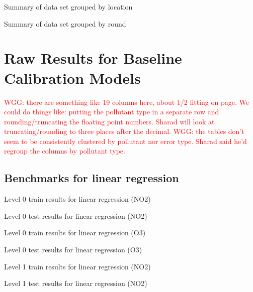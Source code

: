 \documentclass[journal abbreviation, manuscript]{copernicus}
\newcommand\todo[1]{\textcolor{red}{#1}}
\begin{document}
\begin{table}[H]
\scriptsize

\caption{Summary of data set grouped by location}
\label{tab:locationsummary}
\end{table}

\begin{table}[H]
\scriptsize

\caption{Summary of data set grouped by round}
\label{tab:roundsummary}
\end{table}

\section{Raw Results for Baseline Calibration Models}
\label{sec:simpleresults}
\todo{WGG: there are something like 19 columns here, about 1/2 fitting on page.  We could do things like: putting the pollutant type in a separate row and rounding/truncating the floating point numbers.  Sharad will look at truncating/rounding to three places after the decimal.}
\todo{WGG: the tables don't seem to be consistently clustered by pollutant nor error type.  Sharad said he'd regroup the columns by pollutant type.}

\subsection{Benchmarks for linear regression}
\label{sec:results-lr}

\begin{table}[H]
\centering
\scriptsize

\caption{Level 0 train results for linear regression (NO2)}
\end{table}
\begin{table}[H]
\centering
\scriptsize

\caption{Level 0 test results for linear regression (NO2)}
\end{table}

\begin{table}[H]
\centering
\scriptsize

\caption{Level 0 train results for linear regression (O3)}
\end{table}
\begin{table}[H]
\centering
\scriptsize

\caption{Level 0 test results for linear regression (O3)}
\end{table}

\begin{table}[H]
\centering
\scriptsize

\caption{Level 1 train results for linear regression (NO2)}
\end{table}
\begin{table}[H]
\centering
\scriptsize

\caption{Level 1 test results for linear regression (NO2)}
\end{table}
\end{document}

